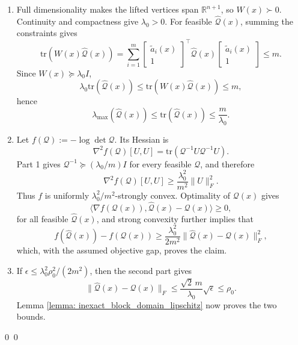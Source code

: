 \documentclass[smallextended]{svjour3}
\let\springerproof\proof
\let\endspringerproof\endproof
\renewenvironment{proof}{\springerproof}{%
  \ifhmode\qed\else\leavevmode\qed\fi\endspringerproof}
\newcommand{\R}{\mathbb{R}}
\newcommand{\tr}{\mathrm{tr}}
\begin{document}
\begin{proof}
    \begin{enumerate}
        \item Full dimensionality makes the lifted vertices span $\R^{n+1}$,
        so $W(x)\succ0$. Continuity and compactness give $\lambda_0>0$. For
        feasible $\widehat{\mathcal Q}(x)$, summing the constraints gives
        \[
            \tr(W(x)\widehat{\mathcal{Q}}(x))
            =
            \sum_{i=1}^m
            \begin{bmatrix}
                \tilde{a}_i(x)\\ 1
            \end{bmatrix}^{\top}
            \widehat{\mathcal{Q}}(x)
            \begin{bmatrix}
                \tilde{a}_i(x)\\ 1
            \end{bmatrix}
            \le m.
        \]
        Since $W(x)\succeq \lambda_0 I$,
        \[
            \lambda_0\tr(\widehat{\mathcal{Q}}(x))
            \le
            \tr(W(x)\widehat{\mathcal{Q}}(x))
            \le m,
        \]
        hence
        \[
            \lambda_{\max}(\widehat{\mathcal{Q}}(x))
            \le
            \tr(\widehat{\mathcal{Q}}(x))
            \le
            \frac{m}{\lambda_0}.
        \]

        \item Let $f(\mathcal{Q}):=-\log \det \mathcal{Q}$. Its Hessian is
        \[
            \nabla^2 f(\mathcal{Q})[U,U]
            =
            \tr(\mathcal{Q}^{-1}U\mathcal{Q}^{-1}U).
        \]
        Part 1 gives $\mathcal{Q}^{-1}\succeq(\lambda_0/m)I$ for every feasible
        $\mathcal Q$, and therefore
        \[
            \nabla^2 f(\mathcal{Q})[U,U]
            \ge
            \frac{\lambda_0^2}{m^2}\|U\|_F^2.
        \]
        Thus $f$ is uniformly $\lambda_0^2/m^2$-strongly convex. Optimality of
        $\mathcal Q(x)$ gives
        \[
            \langle \nabla f(\mathcal{Q}(x)),\widehat{\mathcal{Q}}(x)-\mathcal{Q}(x)\rangle \ge 0,
        \]
        for all feasible $\widehat{\mathcal{Q}}(x)$,  and strong convexity further implies that 
        \[
            f(\widehat{\mathcal{Q}}(x))-f(\mathcal{Q}(x))
            \ge
            \frac{\lambda_0^2}{2m^2}\|\widehat{\mathcal{Q}}(x)-\mathcal{Q}(x)\|_F^2,
        \]
        which, with the assumed objective gap, proves the claim.

        \item If $\epsilon\le \lambda_0^2\rho_0^2/(2m^2)$, then the second part gives
        \[
            \|\widehat{\mathcal{Q}}(x)-\mathcal{Q}(x)\|_F
            \le
            \frac{\sqrt{2}\,m}{\lambda_0}\sqrt{\epsilon}
            \le
            \rho_0.
        \]
        Lemma \ref{lemma: inexact_block_domain_lipschitz} now proves the two bounds.
    \end{enumerate}
\end{proof}
\end{document}
